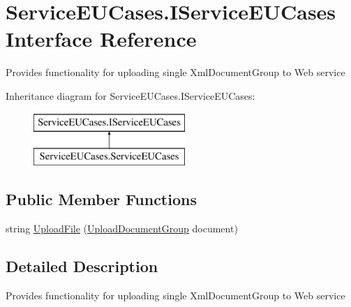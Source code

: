 \hypertarget{interface_service_e_u_cases_1_1_i_service_e_u_cases}{\section{Service\-E\-U\-Cases.\-I\-Service\-E\-U\-Cases Interface Reference}
\label{interface_service_e_u_cases_1_1_i_service_e_u_cases}
}


Provides functionality for uploading single Xml\-Document\-Group to Web service  


Inheritance diagram for Service\-E\-U\-Cases.\-I\-Service\-E\-U\-Cases\-:\begin{figure}[H]
\begin{center}
\leavevmode
\includegraphics[height=2.000000cm]{interface_service_e_u_cases_1_1_i_service_e_u_cases}
\end{center}
\end{figure}
\subsection*{Public Member Functions}
\begin{DoxyCompactItemize}
\item 
string \hyperlink{interface_service_e_u_cases_1_1_i_service_e_u_cases_afd1213b359b1eeaee46bece0797347df}{Upload\-File} (\hyperlink{class_service_e_u_cases_1_1_upload_document_group}{Upload\-Document\-Group} document)
\end{DoxyCompactItemize}


\subsection{Detailed Description}
Provides functionality for uploading single Xml\-Document\-Group to Web service 



